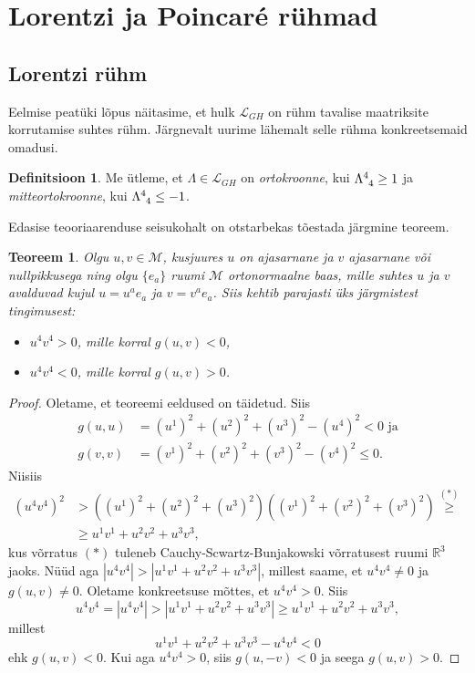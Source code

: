 \documentclass[12pt]{article}
\theoremstyle{plain}
\newtheorem{teoreem}{Teoreem}[section]
\theoremstyle{definition}
\newtheorem{definitsioon}{Definitsioon}[section]
\numberwithin{equation}{section}
\def\R{{\mathbb R}}
\def\L{{\mathcal L}}
\def\M{{\mathcal M}}
\begin{document}
\newpage
\section{Lorentzi ja Poincar\'e rühmad}

\subsection{Lorentzi rühm}

Eelmise peatüki lõpus näitasime, et hulk $\L_{GH}$ on rühm 
tavalise maatriksite korrutamise suhtes rühm. Järgnevalt uurime 
lähemalt selle rühma konkreetsemaid omadusi.

\begin{definitsioon}
Me ütleme, et $\Lambda \in \L_{GH}$ on \emph{ortokroonne}, kui 
$\Lambda\indices{^4_4} \geq 1$ ja \emph{mitteortokroonne}, kui 
$\Lambda\indices{^4_4} \leq -1$.
\end{definitsioon}

Edasise teooriaarenduse seisukohalt on otstarbekas tõestada järgmine 
teoreem.
\begin{teoreem} \textnormal{\cite[teoreem 1.3.1]{Naber}} 
\label{teoreem:ajasarnased_vektorid}
Olgu $u, v \in \M$, kusjuures $u$ on ajasarnane ja $v$ ajasarnane 
või nullpikkusega ning olgu $\{e_a\}$ ruumi $\M$ ortonormaalne baas, 
mille suhtes $u$ ja $v$ avalduvad kujul $u = u^a e_a$ ja 
$v = v^a e_a$. Siis kehtib parajasti üks järgmistest tingimusest:
\begin{itemize}
\item[$(a)$] $u^4 v^4 > 0$, mille korral $g\left(u, v\right) < 0$,
\item[$(b)$] $u^4 v^4 < 0$, mille korral $g\left(u, v\right) > 0$.
\end{itemize}
\end{teoreem}
\begin{proof}
Oletame, et teoreemi eeldused on täidetud. Siis
\begin{align*}
g \left(u, u\right) &= \left(u^1\right)^2 + \left(u^2\right)^2 + 
	\left(u^3\right)^2 - \left(u^4\right)^2 < 0 \text{ ja} \\
g \left(v, v\right) &= \left(v^1\right)^2 + \left(v^2\right)^2 + 
	\left(v^3\right)^2 - \left(v^4\right)^2 \leq 0.
\end{align*}
Niisiis
\begin{align*}
\left(u^4 v^4\right)^2 &> \left( \left(u^1\right)^2 + 
\left(u^2\right)^2 + \left(u^3\right)^2 \right) 
\left( \left(v^1\right)^2 + \left(v^2\right)^2 + 
\left(v^3\right)^2 \right) \overset{(*)}{\geq} \\
&\geq u^1 v^1 + u^2 v^2 + u^3 v^3,
\end{align*}
kus võrratus $(*)$ tuleneb Cauchy-Scwartz-Bunjakowski võrratusest 
ruumi $\R^3$ jaoks.
Nüüd aga $|u^4 v^4| > |u^1 v^1 + u^2 v^2 + u^3 v^3|$, millest saame, 
et $u^4 v^4 \neq 0$ ja $g\left (u, v\right ) \neq 0$.
Oletame konkreetsuse mõttes, et $u^4 v^4 > 0$. Siis
\[u^4 v^4 = |u^4 v^4| > |u^1 v^1 + u^2 v^2 + u^3 v^3| 
\geq u^1 v^1 + u^2 v^2 + u^3 v^3,\]
millest
\[u^1 v^1 + u^2 v^2 + u^3 v^3 - u^4 v^4 < 0\]
ehk $g\left (u, v\right ) < 0$.
Kui aga $u^4 v^4 > 0$, siis $g\left (u, -v\right ) < 0$ ja seega 
$g \left (u, v\right ) > 0$.
\end{proof}
\end{document}
